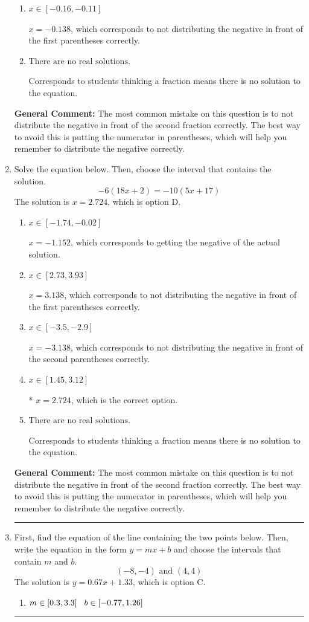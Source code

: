 \documentclass{extbook}[14pt]
\newcommand{\litem}[1]{\item #1

\rule{\textwidth}{0.4pt}}
\begin{document}
\begin{enumerate}
{\begin{enumerate}[label=\Alph*.]
$x = 0.211$, which corresponds to getting the negative of the actual solution.
\item \( x \in [-0.16, -0.11] \)

$x = -0.138$, which corresponds to not distributing the negative in front of the first parentheses correctly.
\item \( \text{There are no real solutions.} \)

Corresponds to students thinking a fraction means there is no solution to the equation.
\end{enumerate}

\textbf{General Comment:} The most common mistake on this question is to not distribute the negative in front of the second fraction correctly. The best way to avoid this is putting the numerator in parentheses, which will help you remember to distribute the negative correctly.
}
\litem{
Solve the equation below. Then, choose the interval that contains the solution.
\[ -6(18x + 2) = -10(5x + 17) \]The solution is \( x = 2.724 \), which is option D.\begin{enumerate}[label=\Alph*.]
\item \( x \in [-1.74, -0.02] \)

$x = -1.152$, which corresponds to getting the negative of the actual solution.
\item \( x \in [2.73, 3.93] \)

$x = 3.138$, which corresponds to not distributing the negative in front of the first parentheses correctly.
\item \( x \in [-3.5, -2.9] \)

$x = -3.138$, which corresponds to not distributing the negative in front of the second parentheses correctly.
\item \( x \in [1.45, 3.12] \)

* $x = 2.724$, which is the correct option.
\item \( \text{There are no real solutions.} \)

Corresponds to students thinking a fraction means there is no solution to the equation.
\end{enumerate}

\textbf{General Comment:} The most common mistake on this question is to not distribute the negative in front of the second fraction correctly. The best way to avoid this is putting the numerator in parentheses, which will help you remember to distribute the negative correctly.
}
\litem{
First, find the equation of the line containing the two points below. Then, write the equation in the form $ y=mx+b $ and choose the intervals that contain $m$ and $b$.
\[ (-8, -4) \text{ and } (4, 4) \]The solution is \( y = 0.67x + 1.33 \), which is option C.\begin{enumerate}[label=\Alph*.]
\item \( m \in [0.3, 3.3] \hspace*{3mm} b \in [-0.77, 1.26] \)


\end{enumerate}}
\end{enumerate}
\end{document}
